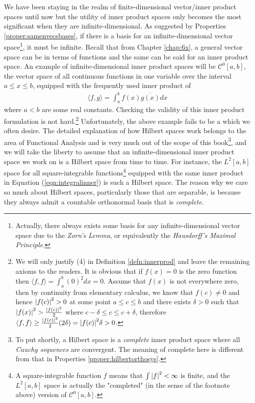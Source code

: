 We have been staying in the realm of finite-dimensional vector/inner product spaces until now but the utility of inner product spaces only becomes the most significant when they are infinite-dimensional. As suggested by Properties \ref{proper:samenvecsbases}, if there is a basis for an infinite-dimensional vector space\footnote{Actually, there always exists some basis for any infinite-dimensional vector space due to the \textit{Zorn's Lemma}, or equivalently the \textit{Hausdorff's Maximal Principle}.}, it must be infinite. Recall that from Chapter \ref{chap:6x}, a general vector space can be in terms of functions and the same can be said for an inner product space. An example of infinite-dimensional inner product spaces will be $\mathcal{C}^0[a,b]$, the vector space of all continuous functions in one variable over the interval $a \leq x \leq b$, equipped with the frequently used inner product of
\begin{align}
\langle f,g \rangle = \int_a^b f(x) \overline{g(x)} dx \label{eqn:integralinner}
\end{align}
where $a < b$ are some real constants. Checking the validity of this inner product formulation is not hard.\footnote{We will only justify (4) in Definition \ref{defn:innerprod} and leave the remaining axioms to the readers. It is obvious that if $f(x) = 0$ is the zero function then $\langle f,f \rangle = \int_a^b (0)^2 dx = 0$. Assume that $f(x)$ is not everywhere zero, then by continuity from elementary calculus, we know that $f(c) \neq 0$ and hence $\abs{f(c)}^2 > 0$ at some point $a \leq c \leq b$ and there exists $\delta > 0$ such that $\abs{f(x)}^2 > \frac{\abs{f(c)}^2}{2}$ where $c-\delta \leq c \leq c+\delta$, therefore $\langle f,f \rangle \geq \frac{\abs{f(c)}^2}{2} (2\delta) = \abs{f(c)}^2 \delta > 0$.} 
Unfortunately, the above example fails to be a  which we often desire. The detailed explanation of how Hilbert spaces work belongs to the area of Functional Analysis and is very much out of the scope of this book\footnote{To put shortly, a Hilbert space is a \textit{complete} inner product space where all \textit{Cauchy sequences} are convergent. The meaning of complete here is different from that in Properties \ref{proper:hilbertorthosys}.}, and we will take the liberty to assume that an infinite-dimensional inner product space we work on is a  Hilbert space from time to time. For instance, the $L^2[a,b]$ space for all square-integrable functions\footnote{A square-integrable function $f$ means that $\int \abs{f}^2 < \infty$ is finite, and the $L^2[a,b]$ space is actually the "completed" (in the sense of the footnote above) version of $\mathcal{C}^0[a,b]$.} equipped with the same inner product in Equation (\ref{eqn:integralinner}) is such a Hilbert space. The reason why we care so much about Hilbert spaces, particularly those that are separable, is because they always admit a countable orthonormal basis that is \textit{complete}.
